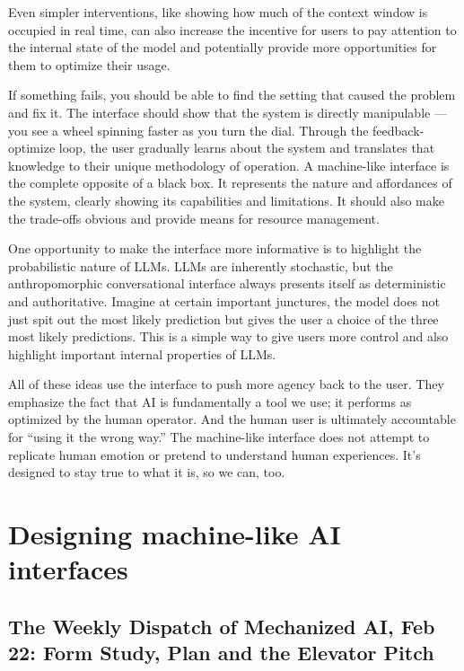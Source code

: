 \documentclass[12pt]{article}
\begin{document}
\begin{description}
    Even simpler interventions, like showing how much of the context window is occupied in real time, can also increase the incentive for users to pay attention to the internal state of the model and potentially provide more opportunities for them to optimize their usage.
    \item[Informative] If something fails, you should be able to find the setting that caused the problem and fix it. The interface should show that the system is directly manipulable — you see a wheel spinning faster as you turn the dial. Through the feedback-optimize loop, the user gradually learns about the system and translates that knowledge to their unique methodology of operation. A machine-like interface is the complete opposite of a black box. It represents the nature and affordances of the system, clearly showing its capabilities and limitations. It should also make the trade-offs obvious and provide means for resource management.

    One opportunity to make the interface more informative is to highlight the probabilistic nature of LLMs. LLMs are inherently stochastic, but the anthropomorphic conversational interface always presents itself as deterministic and authoritative. Imagine at certain important junctures, the model does not just spit out the most likely prediction but gives the user a choice of the three most likely predictions. This is a simple way to give users more control and also highlight important internal properties of LLMs.
\end{description}

All of these ideas use the interface to push more agency back to the user. They emphasize the fact that AI is fundamentally a tool we use; it performs as optimized by the human operator. And the human user is ultimately accountable for ``using it the wrong way.'' The machine-like interface does not attempt to replicate human emotion or pretend to understand human experiences. It's designed to stay true to what it is, so we can, too.

\section{Designing machine-like AI interfaces}

\subsection[Feb 22]{The Weekly Dispatch of Mechanized AI, Feb 22: Form Study, Plan and the Elevator Pitch}
\end{document}
